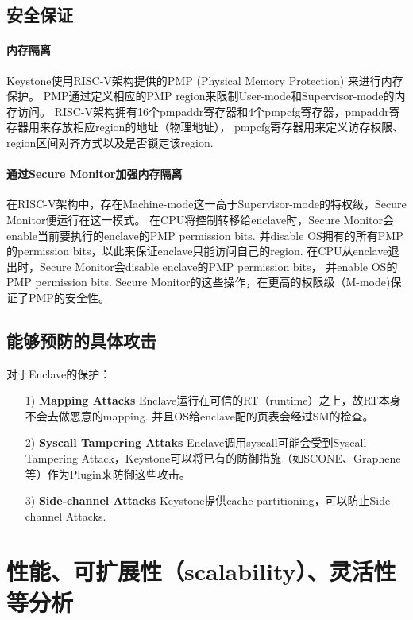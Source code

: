 \subsection{安全保证}
\paragraph{内存隔离}
Keystone使用RISC-V架构提供的PMP (Physical Memory Protection) 来进行内存保护。
PMP通过定义相应的PMP region来限制User-mode和Supervisor-mode的内存访问。
RISC-V架构拥有16个pmpaddr寄存器和4个pmpcfg寄存器，pmpaddr寄存器用来存放相应region的地址（物理地址），
pmpcfg寄存器用来定义访存权限、region区间对齐方式以及是否锁定该region.
\paragraph{通过Secure Monitor加强内存隔离}
在RISC-V架构中，存在Machine-mode这一高于Supervisor-mode的特权级，Secure Monitor便运行在这一模式。
在CPU将控制转移给enclave时，Secure Monitor会enable当前要执行的enclave的PMP permission bits. 
并disable OS拥有的所有PMP的permission bits，以此来保证enclave只能访问自己的region.
在CPU从enclave退出时，Secure Monitor会disable enclave的PMP permission bits，
并enable OS的PMP permission bits.
Secure Monitor的这些操作，在更高的权限级（M-mode)保证了PMP的安全性。

\subsection{能够预防的具体攻击}
对于Enclave的保护：
\begin{itemize}
	\item [1)]
	\textbf{Mapping Attacks} Enclave运行在可信的RT（runtime）之上，故RT本身不会去做恶意的mapping. 并且OS给enclave配的页表会经过SM的检查。
	\item [2)]
	\textbf{Syscall Tampering Attaks} Enclave调用syscall可能会受到Syscall Tampering Attack，Keystone可以将已有的防御措施（如SCONE、Graphene等）作为Plugin来防御这些攻击。
	\item [3)]
	\textbf{Side-channel Attacks} Keystone提供cache partitioning，可以防止Side-channel Attacks.
\end{itemize}

\section{性能、可扩展性（scalability）、灵活性等分析}
